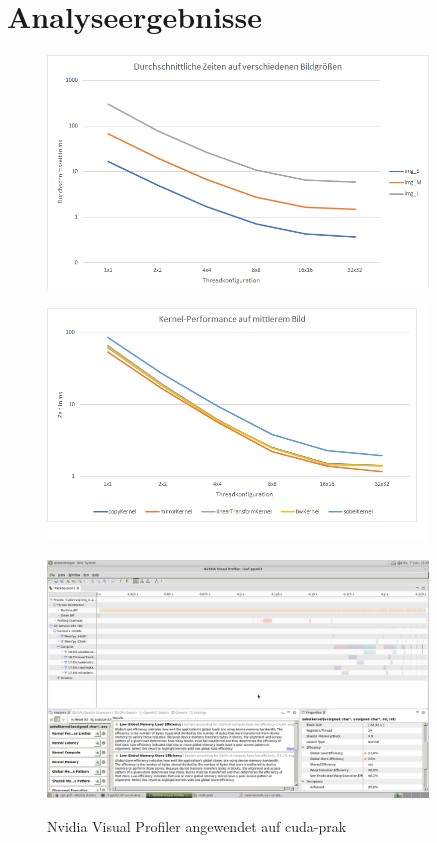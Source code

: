 \documentclass[12pt,a4paper]{scrartcl}
\begin{document}
\section{Analyseergebnisse}
\label{ergebnisse}
\begin{figure}[h]
    \caption{}
    \includegraphics[width=0.9\textwidth]{times(size).png}
    \label{fig:timesize}
\end{figure}

\begin{figure}[h]
    \caption{}
    \includegraphics[width=0.9\textwidth]{times(kernel).png}
    \label{fig:timekernel}
\end{figure}

\begin{figure}[h]
    \caption{Nvidia Visual Profiler angewendet auf cuda-prak}
    \includegraphics[width=0.9\textwidth]{Sobel_Char_Efficiency.png}
    \label{fig:sobelchar}
\end{figure}
\end{document}
